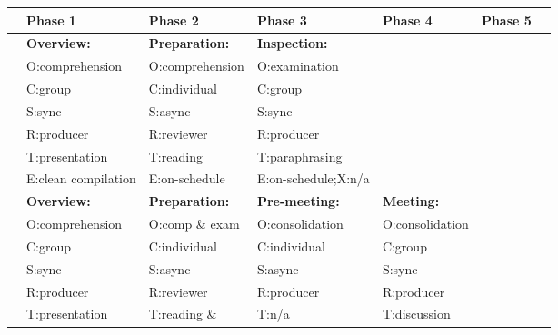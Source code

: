 




\pagestyle{empty}  %
 

\footnotesize
\begin{table}[tb]
  \begin{center}
  \begin{tabular}{|l|l|l|l|l|l|l|}
    \hline 
     & Phase 1 & Phase 2 & Phase 3 & Phase 4 & Phase 5\\
\hline
[Fagan,76] & {\bf Overview:}      & {\bf Preparation:} & {\bf Inspection:}       &    &\\
           & O:comprehension      & O:comprehension & O:examination &    &\\
           & C:group              & C:individual    & C:group     &    &\\
           & S:sync               & S:async         & S:sync     &     & \\ 
           & R:producer           & R:reviewer      & R:producer &     & \\
           & T:presentation       & T:reading       & T:paraphrasing &    &\\
           & E:clean compilation  & E:on-schedule   & E:on-schedule;X:n/a & &\\
\hline
[Humphrey,90] & {\bf Overview:}   & {\bf Preparation:} & {\bf Pre-meeting:} & {\bf Meeting:} &\\
              & O:comprehension   & O:comp \& exam  & O:consolidation   & O:consolidation & \\
              & C:group           & C:individual    & C:individual      & C:group     & \\
              & S:sync            & S:async         & S:async           & S:sync      & \\
              & R:producer        & R:reviewer      & R:producer        & R:producer  &\\
              & T:presentation    & T:reading \&    & T:n/a               & T:discussion    & \\

\end{tabular}
\end{center}
\end{table}
